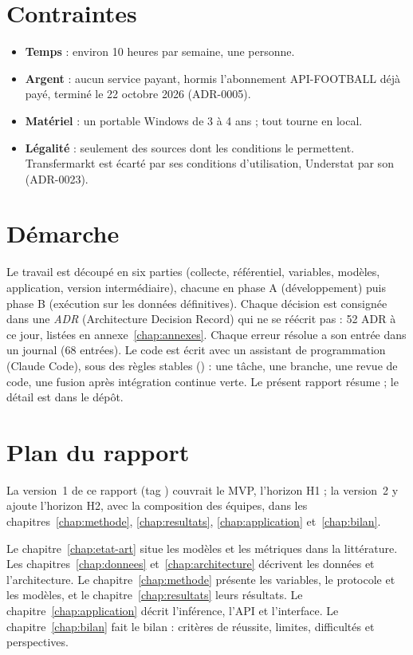 \section{Contraintes}

\begin{itemize}
  \item \textbf{Temps} : environ 10 heures par semaine, une personne.
  \item \textbf{Argent} : aucun service payant, hormis l'abonnement API-FOOTBALL déjà payé, terminé le
        22 octobre 2026 (ADR-0005).
  \item \textbf{Matériel} : un portable Windows de 3 à 4 ans ; tout tourne en local.
  \item \textbf{Légalité} : seulement des sources dont les conditions le permettent. Transfermarkt est
        écarté par ses conditions d'utilisation, Understat par son  (ADR-0023).
\end{itemize}

\section{Démarche}

Le travail est découpé en six parties (collecte, référentiel, variables, modèles, application,
version intermédiaire), chacune en phase A (développement) puis phase B (exécution sur les données
définitives). Chaque décision est consignée dans une \emph{ADR} (Architecture Decision Record) qui ne se
réécrit pas : 52 ADR à ce jour, listées en annexe~\ref{chap:annexes}. Chaque erreur résolue a son entrée
dans un journal (68 entrées). Le code est écrit avec un assistant de programmation (Claude Code), sous
des règles stables () : une tâche, une branche, une revue de code, une fusion après
intégration continue verte. Le présent rapport résume ; le détail est dans le dépôt.

\section{Plan du rapport}

La version~1 de ce rapport (tag ) couvrait le MVP, l'horizon H1 ; la version~2 y ajoute
l'horizon H2, avec la composition des équipes, dans les chapitres~\ref{chap:methode},
\ref{chap:resultats}, \ref{chap:application} et~\ref{chap:bilan}.

Le chapitre~\ref{chap:etat-art} situe les modèles et les métriques dans la littérature. Les
chapitres~\ref{chap:donnees} et~\ref{chap:architecture} décrivent les données et l'architecture. Le
chapitre~\ref{chap:methode} présente les variables, le protocole et les modèles, et le
chapitre~\ref{chap:resultats} leurs résultats. Le chapitre~\ref{chap:application} décrit l'inférence,
l'API et l'interface. Le chapitre~\ref{chap:bilan} fait le bilan : critères de réussite, limites,
difficultés et perspectives.
